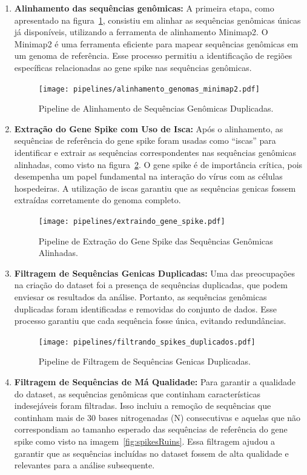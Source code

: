 \begin{enumerate}
  \item \textbf{Alinhamento das sequências genômicas:} A primeira etapa, como apresentado na figura~\ref{fig:alinhamentoGenomas}, consistiu em alinhar as sequências genômicas únicas já disponíveis, utilizando a ferramenta de alinhamento Minimap2. O Minimap2 é uma ferramenta eficiente para mapear sequências genômicas em um genoma de referência. Esse processo permitiu a identificação de regiões específicas relacionadas ao gene spike nas sequências genômicas.
        \begin{figure}[htb]
          \centering
          \caption{Pipeline de Alinhamento de Sequências Genômicas Duplicadas.}
          \texttt{[image: pipelines/alinhamento\_genomas\_minimap2.pdf]}
          ~\label{fig:alinhamentoGenomas}
        \end{figure}
  \item \textbf{Extração do Gene Spike com Uso de Isca:} Após o alinhamento, as sequências de referência do gene spike foram usadas como ``iscas'' para identificar e extrair as sequências correspondentes nas sequências genômicas alinhadas, como visto na figura~\ref{fig:extracaoSpike}. O gene spike é de importância crítica, pois desempenha um papel fundamental na interação do vírus com as células hospedeiras. A utilização de iscas garantiu que as sequências genicas fossem extraídas corretamente do genoma completo.
        \begin{figure}[htb]
          \centering
          \caption{Pipeline de Extração do Gene Spike das Sequências Genômicas Alinhadas.}
          \texttt{[image: pipelines/extraindo\_gene\_spike.pdf]}
          ~\label{fig:extracaoSpike}
        \end{figure}
  \item \textbf{Filtragem de Sequências Genicas Duplicadas:} Uma das preocupações na criação do dataset foi a presença de sequências duplicadas, que podem enviesar os resultados da análise. Portanto, as sequências genômicas duplicadas foram identificadas e removidas do conjunto de dados. Esse processo garantiu que cada sequência fosse única, evitando redundâncias.
        \begin{figure}[htb]
          \centering
          \caption{Pipeline de Filtragem de Sequências Genicas Duplicadas.}
          \texttt{[image: pipelines/filtrando\_spikes\_duplicados.pdf]}
          ~\label{fig:spikeDuplicados}
        \end{figure}
  \item \textbf{Filtragem de Sequências de Má Qualidade:} Para garantir a qualidade do dataset, as sequências genômicas que continham características indesejáveis foram filtradas. Isso incluiu a remoção de sequências que continham mais de 30 bases nitrogenadas (N) consecutivas e aquelas que não correspondiam ao tamanho esperado das sequências de referência do gene spike como visto na imagem~\ref{fig:spikesRuins}. Essa filtragem ajudou a garantir que as sequências incluídas no dataset fossem de alta qualidade e relevantes para a análise subsequente.

\end{enumerate}
